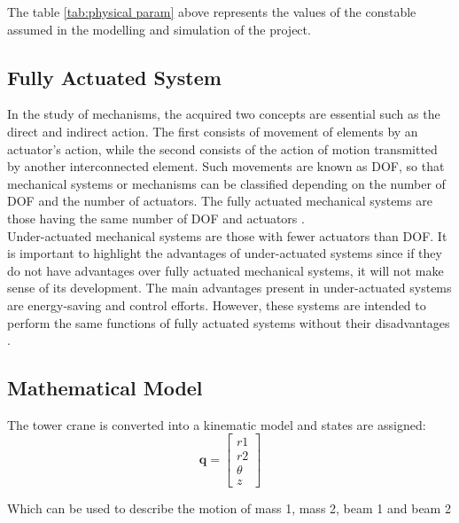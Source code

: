 \documentclass{UoNMCHA}
\numberwithin{equation}{section}
\begin{document}
	The table \ref{tab:physical param} above represents the values of the constable assumed in the modelling and simulation of the project.
	
	
	\subsection{Fully Actuated System}
	
	In the study of mechanisms, the acquired two concepts are essential such as the direct and indirect action. The first consists of movement of elements by an actuator's action, while the second consists of the action of motion transmitted by another interconnected element. Such movements are known as DOF, so that mechanical systems or mechanisms can be classified depending on the number of DOF and the number of actuators. The fully actuated mechanical systems are those having the same number of DOF and actuators \cite{duartemadrid_2017_dynamic}. \\
	
	Under-actuated mechanical systems are those with fewer actuators than DOF. It is important to highlight the advantages of under-actuated systems since if they do not have advantages over fully actuated mechanical systems, it will not make sense of its development. The main advantages present in under-actuated systems are energy-saving and control efforts. However, these systems are intended to perform the same functions of fully actuated systems without their disadvantages \cite{duartemadrid_2017_dynamic}.
	
	\newpage
	\subsection{Mathematical Model}
	
	The tower crane is converted into a kinematic model and states are assigned: 
	\begin{equation}
	\boldsymbol{q} = 
	\begin{bmatrix}
	r1 \\ r2 \\ \theta \\ z
	\end{bmatrix}
	\end{equation}
	
	Which can be used to describe the motion of mass 1, mass 2, beam 1 and beam 2
	
\end{document}
